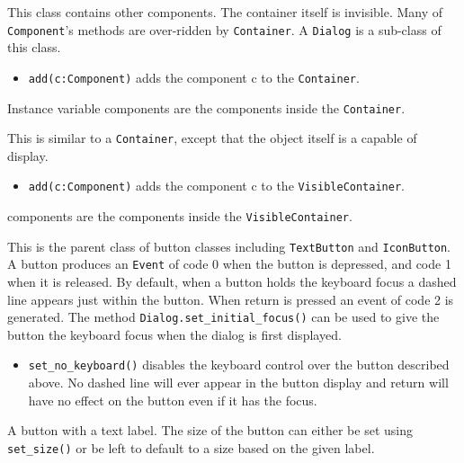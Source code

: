 \medskip{}

This class contains other components. The container itself is
invisible. Many of \texttt{Component}'s methods are over-ridden
by \texttt{Container}. A \texttt{Dialog} is a sub-class of this
class.
\begin{itemize}
\item\noindent\texttt{add(c:Component)} adds the component c to the  \texttt{Container}.
\end{itemize}
Instance variable components are the components inside the  \texttt{Container}.

\medskip{}

This is similar to a  \texttt{Container}, except that the object itself is a
capable of display.

\begin{itemize}
\item\noindent\texttt{add(c:Component)} adds the component c to the  \texttt{VisibleContainer}.
\end{itemize}

components are the components inside the  \texttt{VisibleContainer}.

\medskip{}

This is the parent class of button classes including  \texttt{TextButton} and
 \texttt{IconButton}. A button produces an  \texttt{Event} of code 0 when the button is
depressed, and code 1 when it is released. By default, when a button
holds the keyboard focus a dashed line appears just
within the button. When return is pressed an event of code 2 is
generated. The method \texttt{Dialog.set\_initial\_focus()} can be used to give
the button the keyboard focus when the dialog is first displayed.

\begin{itemize}
\item\noindent\texttt{set\_no\_keyboard()} disables the keyboard control over the button
described above. No dashed line will ever appear in the button
display and return will have no effect on the button even if it has the
focus.
\end{itemize}

\medskip{}

A button with a text label. The size of the button can either be set
using \texttt{set\_size()} or be left to default to a size based on the given
label.

